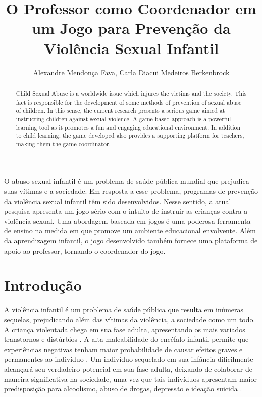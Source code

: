 \documentclass[12pt]{article}
\title{O Professor como Coordenador em um Jogo para Prevenção da Violência Sexual Infantil}
\author{Alexandre Mendonça Fava\inst{1}, Carla Diacui Medeiros Berkenbrock\inst{1}}
\begin{document}
 

\maketitle

\vspace{-0.2cm}

\begin{abstract}
Child Sexual Abuse is a worldwide issue which injures the victims and the society. This fact is responsible for the development of some methods of prevention of sexual abuse of children. In this sense, the current research presents a serious game aimed at instructing children against sexual violence. A game-based approach is a powerful learning tool as it promotes a fun and engaging educational environment. In addition to child learning, the game developed also provides a supporting platform for teachers, making them the game coordinator.
\end{abstract}

\vspace{-0.5cm}

\begin{resumo} 
O abuso sexual infantil é um problema de saúde pública mundial que prejudica suas vítimas e a sociedade. Em resposta a esse problema, programas de prevenção da violência sexual infantil têm sido desenvolvidos. Nesse sentido, a atual pesquisa apresenta um jogo sério com o intuito de instruir as crianças contra a violência sexual. Uma abordagem baseada em jogos é uma poderosa ferramenta de ensino na medida em que promove um ambiente educacional envolvente. Além da aprendizagem infantil, o jogo desenvolvido também fornece uma plataforma de apoio ao professor, tornando-o coordenador do jogo.
\end{resumo}

\vspace{-0.2cm}

\section{Introdução}\label{secao:introducao}

A violência infantil é um problema de saúde pública que resulta em inúmeras sequelas, prejudicando além das vítimas da violência, a sociedade como um todo. A criança violentada chega em sua fase adulta, apresentando os mais variados transtornos e distúrbios \cite{lima2018violencia}. A alta maleabilidade do encéfalo infantil permite que experiências negativas tenham maior probabilidade de causar efeitos graves e permanentes ao indivíduo \cite{pereira2011crescimento}. Um indivíduo sequelado em sua infância dificilmente alcançará seu verdadeiro potencial em sua fase adulta, deixando de colaborar de maneira significativa na sociedade, uma vez que tais indivíduos apresentam maior predisposição para alcoolismo, abuso de drogas, depressão e ideação suicida \cite{da2019violencia}.
\end{document}
